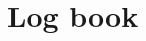 \documentclass{article}
\begin{document}
\fi

\section{Log book}
\label{sec:appendix-logbook}



\ifdefined\mainfile\else
\end{document}
